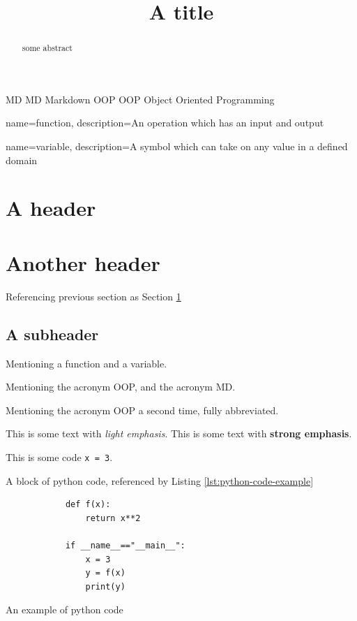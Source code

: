 \documentclass[a4paper, 11pt]{article}
\title{A title}
\begin{document}
    \maketitle
    
    \begin{abstract}
    some abstract
    \end{abstract}
    \clearpage

    \tableofcontents
    \clearpage
    
    \newacronym
        {MD}
        {MD}
        {Markdown}
    \newacronym
        {OOP}
        {OOP}
        {Object Oriented Programming}

    {
        name=function,
        description={An operation which has an input and output}
    }

    {
        name=variable,
        description={A symbol which can take on any value in a defined domain}
    }

    \section{A header}
    \label{sec:my-header}

    \section{Another header}
    \label{another-header}

    Referencing previous section as Section \ref{sec:my-header}

    \subsection{A subheader}
    \label{a-subheader}

    Mentioning a \gls{function} and a \gls{variable}.

    Mentioning the acronym \gls{OOP}, and the acronym \gls{MD}.

    Mentioning the acronym \gls{OOP} a second time, fully abbreviated.

    This is some text with \textit{light emphasis}. This is some text
    with \textbf{strong emphasis}.

    This is some code \texttt{x = 3}.

    A block of python code, referenced by Listing
    \ref{lst:python-code-example}

    \begin{listing}[H]
        \begin{verbatim}
            def f(x):
                return x**2
            
            if __name__=="__main__":
                x = 3
                y = f(x)
                print(y)
        \end{verbatim}
        \caption{An example of python code}
        \label{lst:python-code-example}
    \end{listing}
\end{document}
